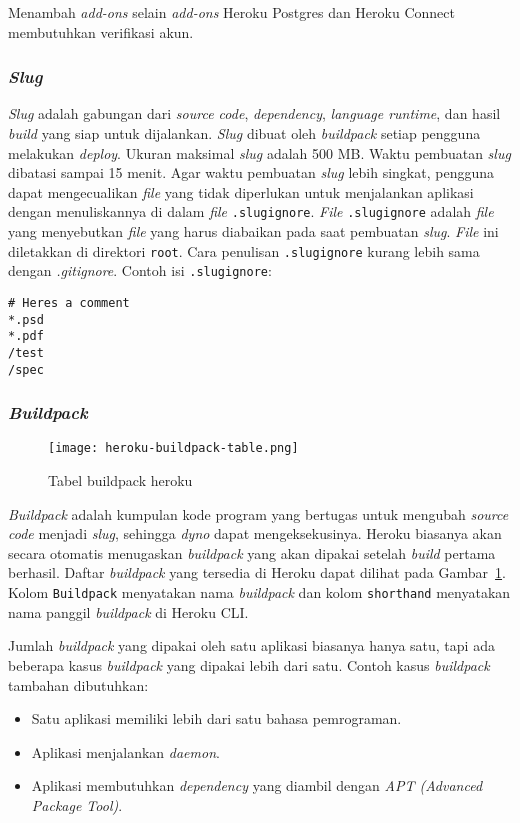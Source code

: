 Menambah \textit{add-ons} selain \textit{add-ons} Heroku Postgres dan Heroku Connect membutuhkan verifikasi akun.

\subsubsection{\textit{Slug}}
\textit{Slug} adalah gabungan dari \textit{source code}, \textit{dependency}, \textit{language runtime}, dan hasil \textit{build} yang siap untuk dijalankan. \textit{Slug} dibuat oleh \textit{buildpack} setiap pengguna melakukan \textit{deploy}. Ukuran maksimal \textit{slug} adalah 500 MB. Waktu pembuatan \textit{slug} dibatasi sampai 15 menit. Agar waktu pembuatan \textit{slug} lebih singkat, pengguna dapat mengecualikan \textit{file} yang tidak diperlukan untuk menjalankan aplikasi dengan menuliskannya di dalam \textit{file} \texttt{.slugignore}. \textit{File} \texttt{.slugignore} adalah \textit{file} yang menyebutkan \textit{file} yang harus diabaikan pada saat pembuatan \textit{slug}. \textit{File} ini diletakkan di direktori \texttt{root}. Cara penulisan \texttt{.slugignore} kurang lebih sama dengan \textit{.gitignore}. Contoh isi \texttt{.slugignore}:
\begin{lstlisting}
# Heres a comment
*.psd
*.pdf
/test
/spec
\end{lstlisting}

\subsubsection{\textit{Buildpack}}
\begin{figure}[H]
	\centering  
	\texttt{[image: heroku-buildpack-table.png]}  
	\caption[Tabel buildpack heroku]{Tabel buildpack heroku} 
	\label{fig:heroku-buildpack-table} 
\end{figure}

\textit{Buildpack} adalah kumpulan kode program yang bertugas untuk mengubah \textit{source code} menjadi \textit{slug}, sehingga \textit{dyno} dapat mengeksekusinya. Heroku biasanya akan secara otomatis menugaskan \textit{buildpack} yang akan dipakai setelah \textit{build} pertama berhasil. Daftar \textit{buildpack} yang tersedia di Heroku dapat dilihat pada Gambar~\ref{fig:heroku-buildpack-table}. Kolom \texttt{Buildpack} menyatakan nama \textit{buildpack} dan kolom \texttt{shorthand} menyatakan nama panggil \textit{buildpack} di Heroku CLI.

Jumlah \textit{buildpack} yang dipakai oleh satu aplikasi biasanya hanya satu, tapi ada beberapa kasus \textit{buildpack} yang dipakai lebih dari satu. Contoh kasus \textit{buildpack} tambahan dibutuhkan:
\begin{itemize}
\item Satu aplikasi memiliki lebih dari satu bahasa pemrograman.
\item Aplikasi menjalankan \textit{daemon}.
\item Aplikasi membutuhkan \textit{dependency} yang diambil dengan \textit{APT (Advanced Package Tool)}.
\end{itemize}

